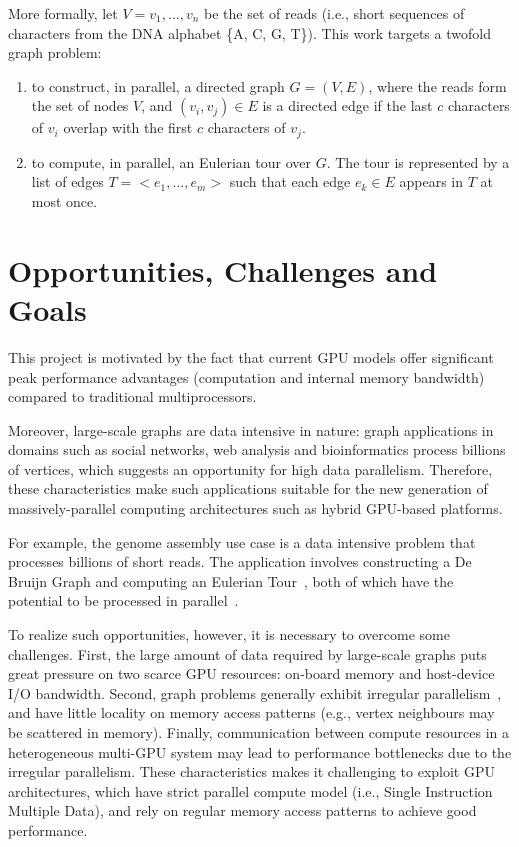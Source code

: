 \documentclass{acm_proc_article-sp}[12pt]
\begin{document}
More formally, let $V={v_1,...,v_n}$ be the set of reads (i.e., short
sequences of characters from the DNA alphabet \{A, C, G, T\}). This
work targets a twofold graph problem:

\begin{enumerate}
 \item to construct, in parallel, a directed graph $G=(V,E)$, where
   the reads form the set of nodes $V$, and $(v_i,v_j) \in E$ is a
   directed edge if the last $c$ characters of $v_i$ overlap with the
   first $c$ characters of $v_j$.

 \item to compute, in parallel, an Eulerian tour over $G$. The tour is
   represented by a list of edges $T=<e_1,...,e_m>$ such that each edge 
   $e_k \in E$ appears in $T$ at most once. 
\end{enumerate}

\section{Opportunities, Challenges and Goals}
\label{sec:opp}

This project is motivated by the fact that current GPU models offer
significant peak performance advantages (computation and internal
memory bandwidth) compared to traditional multiprocessors. 

Moreover, large-scale graphs are data intensive in nature: graph
applications in domains such as social networks, web analysis and
bioinformatics process billions of vertices, which suggests an
opportunity for high data parallelism. Therefore, these
characteristics make such applications suitable for the new
generation of massively-parallel computing architectures such as
hybrid GPU-based platforms.

For example, the genome assembly use case is a data intensive problem
that processes billions of short reads. The application involves
constructing a De Bruijn Graph and computing an Eulerian
Tour~\cite{simpson2009abyss}, both of which have the potential to be
processed in parallel~\cite{Cormen2009,Atallah1984}. 

To realize such opportunities, however, it is necessary to overcome some 
challenges. First, the large amount of data required by large-scale
graphs puts great pressure on two scarce GPU resources: on-board
memory and host-device I/O bandwidth. Second, graph problems generally
exhibit irregular parallelism~\cite{Kulkarni2009}, and have little
locality on memory access patterns (e.g., vertex neighbours may be
scattered in memory). Finally, communication between compute resources
in a heterogeneous multi-GPU system may lead to performance
bottlenecks due to the irregular parallelism. These characteristics
makes it challenging to exploit GPU architectures, which have strict
parallel compute model (i.e., Single Instruction Multiple Data), and
rely on regular memory access patterns to achieve good performance.
\end{document}
